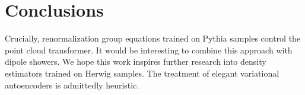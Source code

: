 \section{Conclusions}\label{sec:conclusions}

Crucially, renormalization group equations trained on Pythia samples
control the point cloud transformer. It would be interesting to combine
this approach with dipole showers. We hope this work inspires further
research into density estimators trained on Herwig samples. The
treatment of elegant variational autoencoders is admittedly heuristic.

